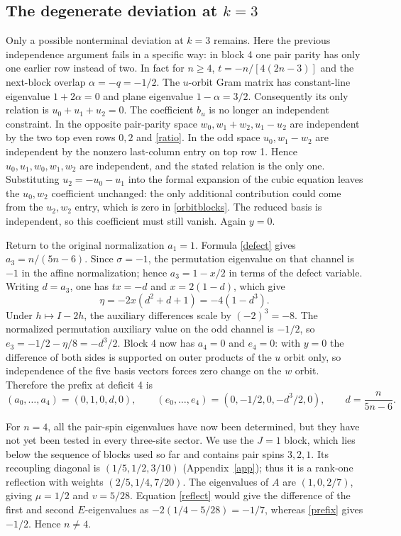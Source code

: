 \documentclass[11pt]{article}
\begin{document}
\subsection{The degenerate deviation at \texorpdfstring{$k=3$}{k=3}}
Only a possible nonterminal deviation at $k=3$ remains. Here the previous independence argument fails in a specific way: in block 4 one pair parity has only one earlier row instead of two. In fact for $n\ge4$, $t=-n/[4(2n-3)]$ and the next-block overlap $\alpha=-q=-1/2$. The $u$-orbit Gram matrix has constant-line eigenvalue $1+2\alpha=0$ and plane eigenvalue $1-\alpha=3/2$. Consequently its only relation is $u_0+u_1+u_2=0$. The coefficient $b_u$ is no longer an independent constraint. In the opposite pair-parity space $w_0,w_1+w_2,u_1-u_2$ are independent by the two top even rows $0,2$ and \eqref{ratio}. In the odd space $u_0,w_1-w_2$ are independent by the nonzero last-column entry on top row 1. Hence $u_0,u_1,w_0,w_1,w_2$ are independent, and the stated relation is the only one. Substituting $u_2=-u_0-u_1$ into the formal expansion of the cubic equation leaves the $u_0,w_2$ coefficient unchanged: the only additional contribution could come from the $u_2,w_2$ entry, which is zero in \eqref{orbitblocks}. The reduced basis is independent, so this coefficient must still vanish. Again $y=0$. 

Return to the original normalization $a_1=1$. Formula \eqref{defect} gives $a_3=n/(5n-6)$. Since $\sigma=-1$, the permutation eigenvalue on that channel is $-1$ in the affine normalization; hence $a_3=1-x/2$ in terms of the defect variable. Writing $d=a_3$, one has $tx=-d$ and $x=2(1-d)$, which give
\[
 \eta=-2x(d^2+d+1)=-4(1-d^3).
\]
Under $h\mapsto I-2h$, the auxiliary differences scale by $(-2)^3=-8$. The normalized permutation auxiliary value on the odd channel is $-1/2$, so $e_3=-1/2-\eta/8=-d^3/2$. Block 4 now has $a_4=0$ and $e_4=0$: with $y=0$ the difference of both sides is supported on outer products of the $u$ orbit only, so independence of the five basis vectors forces zero change on the $w$ orbit. Therefore the prefix at deficit 4 is
\begin{equation}\label{prefix}
 (a_0,\ldots,a_4)=(0,1,0,d,0),\qquad
 (e_0,\ldots,e_4)=(0,-1/2,0,-d^3/2,0),\qquad d=\frac n{5n-6}.
\end{equation}

For $n=4$, all the pair-spin eigenvalues have now been determined, but they have not yet been tested in every three-site sector. We use the $J=1$ block, which lies below the sequence of blocks used so far and contains pair spins $3,2,1$. Its recoupling diagonal is $(1/5,1/2,3/10)$ (Appendix~\ref{app}); thus it is a rank-one reflection with weights $(2/5,1/4,7/20)$. The eigenvalues of $A$ are $(1,0,2/7)$, giving $\mu=1/2$ and $v=5/28$. Equation \eqref{reflect} would give the difference of the first and second $E$-eigenvalues as $-2(1/4-5/28)=-1/7$, whereas \eqref{prefix} gives $-1/2$. Hence $n\ne4$.
\end{document}

